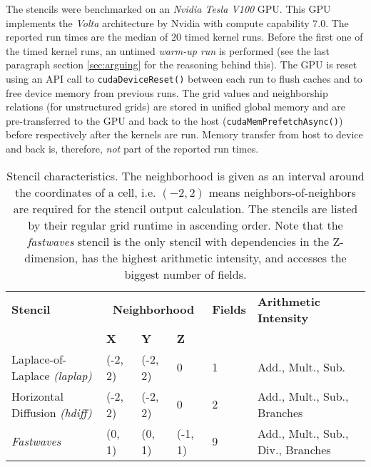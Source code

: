 The stencils were benchmarked on an \emph{Nvidia Tesla V100} GPU. This GPU implements the \emph{Volta} architecture by Nvidia with compute capability $7.0$. The reported run times are the median of 20 timed kernel runs. Before the first one of the timed kernel runs, an untimed \emph{warm-up run} is performed (see the last paragraph section \ref{sec:arguing} for the reasoning behind this). The GPU is reset using an API call to \texttt{cudaDeviceReset()} between each run to flush caches and to free device memory from previous runs. The grid values and neighborship relations (for unstructured grids) are stored in unified global memory and are pre-transferred to the GPU and back to the host (\texttt{cudaMemPrefetchAsync()}) before respectively after the kernels are run. Memory transfer from host to device and back is, therefore, \emph{not} part of the reported run times.

\begin{table}
	\begin{center}                                     
		\begin{tabular}{m{4cm} m{1.25cm} m{1.25cm} m{1.25cm} m{1.25cm} m{4cm}}
		    \textbf{Stencil}  &  \multicolumn{3}{c}{\textbf{Neighborhood}}  &  \textbf{Fields}  &  \textbf{Arithmetic Intensity} \\
		    \cline{2-4}
		    &  \textbf{X}  &  \textbf{Y}  &  \textbf{Z}  & \\
		    \hline
			\hline
		    \raggedright Laplace-of-Laplace \emph{(laplap)}  &  (-2, 2)  &  (-2, 2)  &  0  &  1  & {\raggedright Add., Mult., Sub.} \\
			\hline
		    \raggedright Horizontal Diffusion \emph{(hdiff)}  &  (-2, 2)  &  (-2, 2)  &  0  &  2  &  {\raggedright Add., Mult., Sub., Branches} \\
			\hline
		    \raggedright \emph{Fastwaves}  &  (0, 1)  &  (0, 1)  &  (-1, 1)  &  9  & {\raggedright Add., Mult., Sub., Div., Branches} \\
		    \hline
		\end{tabular}
	\end{center}
	\caption{\label{tab:benchmarked-stencils}Stencil characteristics. The neighborhood is given as an interval around the coordinates of a cell, i.e. $(-2, 2)$ means neighbors-of-neighbors are required for the stencil output calculation. The stencils are listed by their regular grid runtime in ascending order. Note that the \emph{fastwaves} stencil is the only stencil with dependencies in the Z-dimension, has the highest arithmetic intensity, and accesses the biggest number of fields.}
\end{table}

